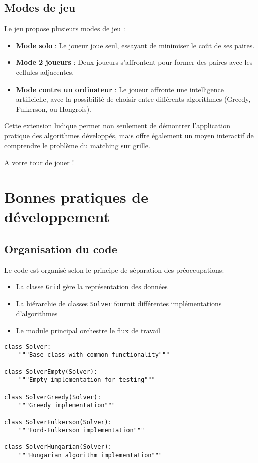 \documentclass[11pt, a4paper]{article}
\begin{document}
\subsection{Modes de jeu}

Le jeu propose plusieurs modes de jeu :

\begin{itemize}
    \item \textbf{Mode solo} : Le joueur joue seul, essayant de minimiser le coût de ses paires.
    \item \textbf{Mode 2 joueurs} : Deux joueurs s'affrontent pour former des paires avec les cellules adjacentes.
    \item \textbf{Mode contre un ordinateur} : Le joueur affronte une intelligence artificielle, avec la possibilité de choisir entre différents algorithmes (Greedy, Fulkerson, ou Hongrois).
\end{itemize}

Cette extension ludique permet non seulement de démontrer l'application pratique des algorithmes développés, mais offre également un moyen interactif de comprendre le problème du matching sur grille.

A votre tour de jouer !

\section{Bonnes pratiques de développement}
\label{sec:bonnes_pratiques}

\subsection{Organisation du code}

Le code est organisé selon le principe de séparation des préoccupations:
\begin{itemize}
    \item La classe \texttt{Grid} gère la représentation des données
    \item La hiérarchie de classes \texttt{Solver} fournit différentes implémentations d'algorithmes
    \item Le module principal orchestre le flux de travail
\end{itemize}

\begin{lstlisting}[caption=Hierarchie des solveurs]
class Solver:
    """Base class with common functionality"""

class SolverEmpty(Solver):
    """Empty implementation for testing"""

class SolverGreedy(Solver):
    """Greedy implementation"""

class SolverFulkerson(Solver):
    """Ford-Fulkerson implementation"""

class SolverHungarian(Solver):
    """Hungarian algorithm implementation"""
\end{lstlisting}
\end{document}
